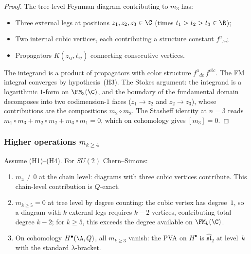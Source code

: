 \begin{proof}
The tree-level Feynman diagram contributing to $m_3$ has:
\begin{itemize}
\item Three external legs at positions $z_1, z_2, z_3 \in \C$
 (times $t_1 > t_2 > t_3 \in \R$);
\item Two internal cubic vertices, each contributing a structure
 constant $f^a{}_{bc}$;
\item Propagators $K(z_{ij}, t_{ij})$ connecting consecutive
 vertices.
\end{itemize}
The integrand is a product of propagators with color structure
$f^{a}{}_{de}\, f^{ebc}$. The FM integral converges by
hypothesis~(H3). The Stokes argument: the integrand is a
logarithmic $1$-form on $\FM_3(\C)$, and the boundary of the
fundamental domain decomposes into two codimension-$1$ faces
($z_1 \to z_2$ and $z_2 \to z_3$), whose contributions are the
compositions $m_2 \circ m_2$. The Stasheff identity at $n=3$
reads $m_1 \circ m_3 + m_2 \circ m_2 + m_3 \circ m_1 = 0$,
which on cohomology gives $[m_3] = 0$.
\end{proof}

\subsubsection{Higher operations $m_{k \geq 4}$}

\begin{proposition}
Assume \textrm{(H1)--(H4)}. For $SU(2)$ Chern--Simons:
\begin{enumerate}[label=\textup{(\roman*)}]
\item $m_4 \neq 0$ at the chain level: diagrams with three cubic
 vertices contribute. This chain-level contribution is $Q$-exact.
\item $m_{k \geq 5} = 0$ at tree level by degree counting: the
 cubic vertex has degree~$1$, so a diagram with $k$ external legs
 requires $k-2$ vertices, contributing total degree $k-2$;
 for $k \geq 5$, this exceeds the degree available on
 $\FM_k(\C)$.
\item On cohomology $H^\bullet(\A, Q)$, all $m_{k \geq 3}$
 vanish: the PVA on $H^\bullet$ is
 $\widehat{\mathfrak{sl}}_2$ at level~$k$ with the standard
 $\lambda$-bracket.
\end{enumerate}
\end{proposition}

